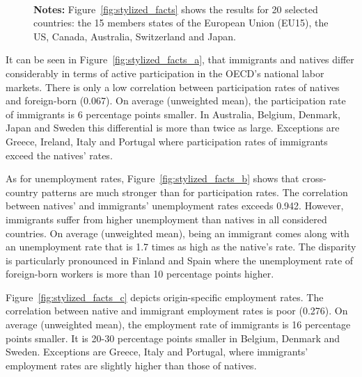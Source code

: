 \documentclass[a4paper,12pt]{article}
\begin{document}
\begin{figure}[htb!]
\begin{subfigure}{.45\linewidth}
\end{subfigure}
\\[0.5cm]
{\footnotesize \textbf{Notes:} Figure~\ref{fig:stylized_facts} shows the results for 20 selected countries: the 15 members states of the European Union (EU15), the US, Canada, Australia, Switzerland and Japan.}
\end{figure}

It can be seen in Figure~\ref{fig:stylized_facts_a}, that immigrants and natives differ considerably in terms of active participation in the OECD's national labor markets. There is only a low correlation between participation rates of natives and foreign-born (0.067). On average (unweighted mean), the participation rate of immigrants is 6 percentage points smaller. In Australia, Belgium, Denmark, Japan and Sweden this differential is more than twice as large. Exceptions are Greece, Ireland, Italy and Portugal where participation rates of immigrants exceed the natives' rates.

As for unemployment rates, Figure~\ref{fig:stylized_facts_b} shows that cross-country patterns are much stronger than for participation rates. The correlation between natives' and immigrants' unemployment rates exceeds 0.942. However, immigrants suffer from higher unemployment than natives in all considered countries. On average (unweighted mean), being an immigrant comes along with an unemployment rate that is 1.7 times as high as the native's rate. The disparity is particularly pronounced in Finland and Spain where the unemployment rate of foreign-born workers is more than 10 percentage points higher. 

Figure~\ref{fig:stylized_facts_c} depicts origin-specific employment rates. The correlation between native and immigrant employment rates is poor (0.276). On average (unweighted mean), the employment rate of immigrants is 16 percentage points smaller. It is 20-30 percentage points smaller in Belgium, Denmark and Sweden. Exceptions are Greece, Italy and Portugal, where immigrants' employment rates are slightly higher than those of natives.
\end{document}
